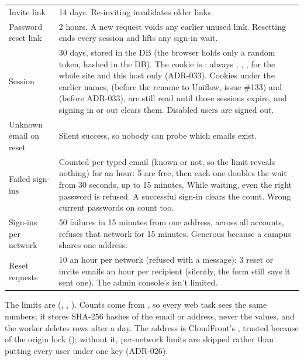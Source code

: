 {\tablefont
\begin{xltabular}{\linewidth}{@{}P{30mm} L@{}}
  \toprule
   & \\
  \midrule
  \endhead
  Invite link & 14 days. Re-inviting invalidates older links.\\
  Password reset link & 2 hours. A new request voids any earlier unused link. Resetting ends every session and lifts any sign-in wait.\\
  Session & 30 days, stored in the DB (the browser holds only a random token, hashed in the DB). The cookie is : always , , , for the whole site and this host only (ADR-033). Cookies under the earlier names,  (before the rename to Uniflow, issue \#133) and  (before ADR-033), are still read until those sessions expire, and signing in or out clears them. Disabled users are signed out.\\
  Unknown email on reset & Silent success, so nobody can probe which emails exist.\\
  Failed sign-ins & Counted per typed email (known or not, so the limit reveals nothing) for an hour: 5 are free, then each one doubles the wait from 30 seconds, up to 15 minutes. While waiting, even the right password is refused. A successful sign-in clears the count. Wrong current passwords on  count too.\\
  Sign-ins per network & 50 failures in 15 minutes from one address, across all accounts, refuses that network for 15 minutes. Generous because a campus shares one address.\\
  Reset requests & 10 an hour per network (refused with a message); 3 reset or invite emails an hour per recipient (silently, the form still says it sent one). The admin console's  isn't limited.\\
\bottomrule
\end{xltabular}}

The limits are  (, ,
). Counts come from , so every web task sees the same
numbers; it stores SHA-256 hashes of the email or address, never the values, and the worker
deletes rows after a day. The address is CloudFront's , trusted
because of the origin lock (); without it, per-network limits are
skipped rather than putting every user under one key (ADR-026).


